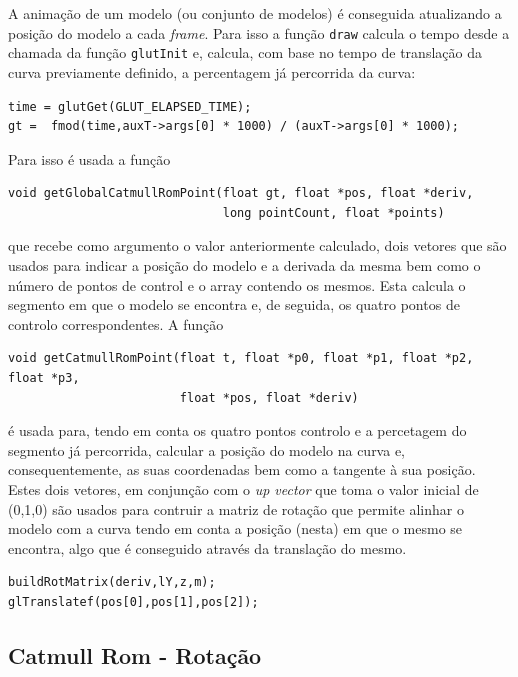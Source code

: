 \documentclass{article}
\begin{document}
A animação de um modelo (ou conjunto de modelos) é conseguida atualizando a posição do modelo a cada \textit{frame}. Para isso a função \texttt{draw} calcula o tempo desde a chamada da função \texttt{glutInit} e, calcula, com base no tempo de translação da curva previamente definido, a percentagem já percorrida da curva:
\begin{verbatim}
time = glutGet(GLUT_ELAPSED_TIME);
gt =  fmod(time,auxT->args[0] * 1000) / (auxT->args[0] * 1000);
\end{verbatim}
Para isso é usada a função 
\begin{verbatim}
void getGlobalCatmullRomPoint(float gt, float *pos, float *deriv, 
                              long pointCount, float *points)
\end{verbatim}
que recebe como argumento o valor anteriormente calculado, dois vetores que são usados para indicar a posição do modelo e a derivada da mesma bem como o número de pontos de control e o array contendo os mesmos. Esta calcula o segmento em que o modelo se encontra e, de seguida, os quatro pontos de controlo correspondentes. 
A função
\begin{verbatim}
void getCatmullRomPoint(float t, float *p0, float *p1, float *p2, float *p3, 
                        float *pos, float *deriv)
\end{verbatim}
é usada para, tendo em conta os quatro pontos controlo e a percetagem do segmento já percorrida, calcular a posição do modelo na curva e, consequentemente, as suas coordenadas bem como a tangente à sua posição. Estes dois vetores, em conjunção com o \textit{up vector} que toma o valor inicial de (0,1,0) são usados para contruir a matriz de rotação que permite alinhar o modelo com a curva tendo em conta a posição (nesta) em que o mesmo se encontra, algo que é conseguido através da translação do mesmo.
\begin{verbatim}
buildRotMatrix(deriv,lY,z,m);
glTranslatef(pos[0],pos[1],pos[2]);
\end{verbatim}

\subsection{Catmull Rom - Rotação}
\end{document}
